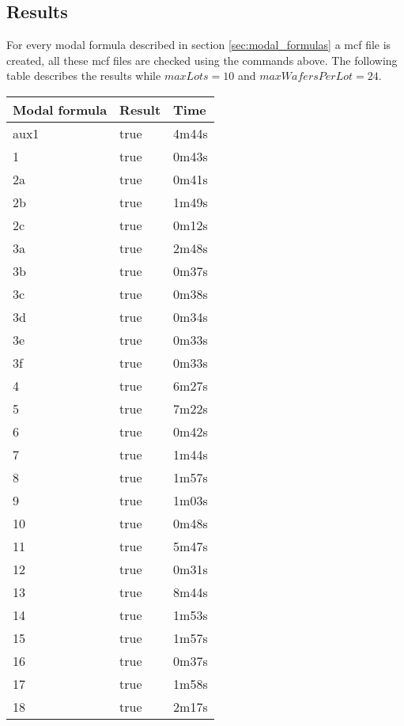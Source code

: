 \subsection{Results}
For every modal formula described in section \ref{sec:modal_formulas} a mcf file is created, all these mcf files are checked using the commands above. The following table describes the results while $\mathit{maxLots} = 10$ and $\mathit{maxWafersPerLot} = 24$.
\begin{table}[h]
\label{my-label}
\begin{tabular}{|l|l|l|}
\hline
\textbf{Modal formula} & \textbf{Result} & \textbf{Time} \\ \hline
aux1 & true & 4m44s \\ \hline
1 & true & 0m43s \\ \hline
2a & true & 0m41s \\ \hline
2b & true & 1m49s \\ \hline
2c & true & 0m12s \\ \hline
3a & true & 2m48s \\ \hline
3b & true & 0m37s \\ \hline
3c & true & 0m38s \\ \hline
3d & true & 0m34s \\ \hline
3e & true & 0m33s \\ \hline
3f & true & 0m33s \\ \hline
4 & true & 6m27s \\ \hline
5 & true & 7m22s \\ \hline
6 & true & 0m42s \\ \hline
7 & true & 1m44s \\ \hline
8 & true & 1m57s \\ \hline
9 & true & 1m03s \\ \hline
10 & true & 0m48s \\ \hline
11 & true & 5m47s \\ \hline
12 & true & 0m31s \\ \hline
13 & true & 8m44s \\ \hline
14 & true & 1m53s \\ \hline
15 & true & 1m57s \\ \hline
16 & true & 0m37s \\ \hline
17 & true & 1m58s \\ \hline
18 & true & 2m17s \\ \hline
\end{tabular}
\end{table}